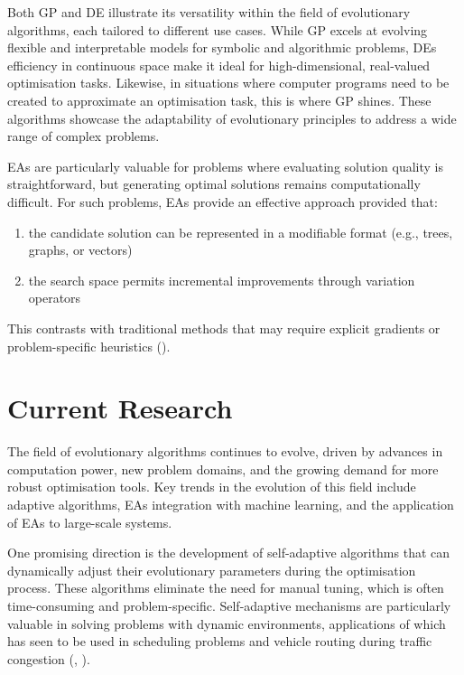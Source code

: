 \parbreak\noindent Both GP and DE illustrate its versatility within the field of evolutionary algorithms, each tailored to different use cases. While GP excels at evolving flexible and interpretable models for symbolic and algorithmic problems, DEs efficiency in continuous space make it ideal for high-dimensional, real-valued optimisation tasks. Likewise, in situations where computer programs need to be created to approximate an optimisation task, this is where GP shines. These algorithms showcase the adaptability of evolutionary principles to address a wide range of complex problems.

\parbreak\noindent EAs are particularly valuable for problems where evaluating solution quality is straightforward, but generating optimal solutions remains computationally difficult. For such problems, EAs provide an effective approach provided that:
\begin{enumerate}
	\item the candidate solution can be represented in a modifiable format (e.g., trees, graphs, or vectors)
	\item the search space permits incremental improvements through variation operators
\end{enumerate}

\noindent This contrasts with traditional methods that may require explicit gradients or problem-specific heuristics (\cite{intelligentOptimization}).


\section{Current Research}\label{sec:ea_current_research}
The field of evolutionary algorithms continues to evolve, driven by advances in computation power, new problem domains, and the growing demand for more robust optimisation tools. Key trends in the evolution of this field include adaptive algorithms, EAs integration with machine learning, and the application of EAs to large-scale systems.

\parbreak\noindent One promising direction is the development of self-adaptive algorithms that can dynamically adjust their evolutionary parameters during the optimisation process. These algorithms eliminate the need for manual tuning, which is often time-consuming and problem-specific. Self-adaptive mechanisms are particularly valuable in solving problems with dynamic environments, applications of which has seen to be used in scheduling problems and vehicle routing during traffic congestion (\cite{dulebenets2018self}, \cite{sabar2019self}).

